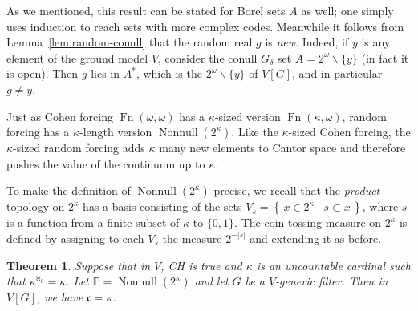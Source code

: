 \documentclass[11pt,oneside]{amsbook}
\newcommand{\set}[1]{\left\{\,#1\,\right\}}
\newcommand{\PP}{\mathbb P}
\DeclareMathOperator{\Fn}{Fn}
\DeclareMathOperator{\Nonnull}{Nonnull}
\theoremstyle{definition}
\theoremstyle{plain}
\newtheorem{theorem}{Theorem}[section]
\theoremstyle{definition}
\theoremstyle{remark}
\numberwithin{equation}{section}
\numberwithin{figure}{section}
\begin{document}
As we mentioned, this result can be stated for Borel sets $A$ as well; one simply uses induction to reach sets with more complex codes. Meanwhile it follows from Lemma~\ref{lem:random-conull} that the random real $g$ is \emph{new}. Indeed, if $y$ is any element of the ground model $V$, consider the conull $G_\delta$ set $A=2^\omega\smallsetminus\{y\}$ (in fact it is open). Then $g$ lies in $A^*$, which is the $2^\omega\smallsetminus\{y\}$ of $V[G]$, and in particular $g\neq y$.

Just as Cohen forcing $\Fn(\omega,\omega)$ has a $\kappa$-sized version $\Fn(\kappa,\omega)$, random forcing has a $\kappa$-length version $\Nonnull(2^\kappa)$. Like the $\kappa$-sized Cohen forcing, the $\kappa$-sized random forcing adds $\kappa$ many new elements to Cantor space and therefore pushes the value of the continuum up to $\kappa$.

To make the definition of $\Nonnull(2^\kappa)$ precise, we recall that the \emph{product} topology on $2^\kappa$ has a basis consisting of the sets $V_s=\set{x\in2^\kappa\mid s\subset x}$, where $s$ is a function from a finite subset of $\kappa$ to $\{0,1\}$. The coin-tossing measure on $2^\kappa$ is defined by assigning to each $V_s$ the measure $2^{-|s|}$ and extending it as before.

\begin{theorem}
  Suppose that in $V$, CH is true and $\kappa$ is an uncountable cardinal such that $\kappa^{\aleph_0}=\kappa$. Let $\PP=\Nonnull(2^\kappa)$ and let $G$ be a $V$-generic filter. Then in $V[G]$, we have $\mathfrak c=\kappa$.
\end{theorem}
\end{document}
